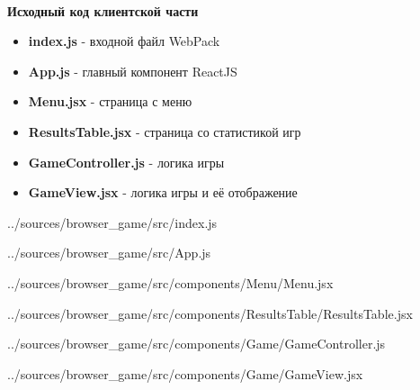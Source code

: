 \documentclass[12pt, a4paper, simple]{eskdtext}
\begin{document}
    

    \thispagestyle{plain}
    \pagestyle{plain}
    \hspace{0pt}

    \paragraph{} \textbf{Исходный код клиентской части}

    \begin{itemize}
        \item \textbf{index.js} - входной файл WebPack
        \item \textbf{App.js} - главный компонент ReactJS
        \item \textbf{Menu.jsx} - страница с меню
        \item \textbf{ResultsTable.jsx} - страница со статистикой игр
        \item \textbf{GameController.js} - логика игры
        \item \textbf{GameView.jsx} - логика игры и её отображение
    \end{itemize}

    
    {../sources/browser_game/src/index.js}

    
    {../sources/browser_game/src/App.js}

    
    {../sources/browser_game/src/components/Menu/Menu.jsx}

    
    {../sources/browser_game/src/components/ResultsTable/ResultsTable.jsx}

    
    {../sources/browser_game/src/components/Game/GameController.js}

    
    {../sources/browser_game/src/components/Game/GameView.jsx}
\end{document}
